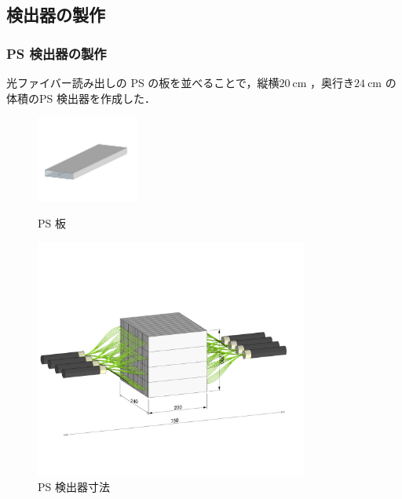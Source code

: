 \subsection{検出器の製作}

\subsubsection{PS 検出器の製作}
光ファイバー読み出しの PS の板を並べることで，縦横$20~\mathrm{cm}$ ，奥行き$24~\mathrm{cm}$ の体積のPS 検出器を作成した．

\begin{figure}[H]
\centering
\includegraphics[width=0.3\textwidth]{figure/hayakawa/psmd.png}
\caption{PS 板}
\includegraphics[width=0.8\textwidth]{figure/hayakawa/p7.png}
\caption{PS 検出器寸法}
\label{PS_sunpou}
\end{figure}

